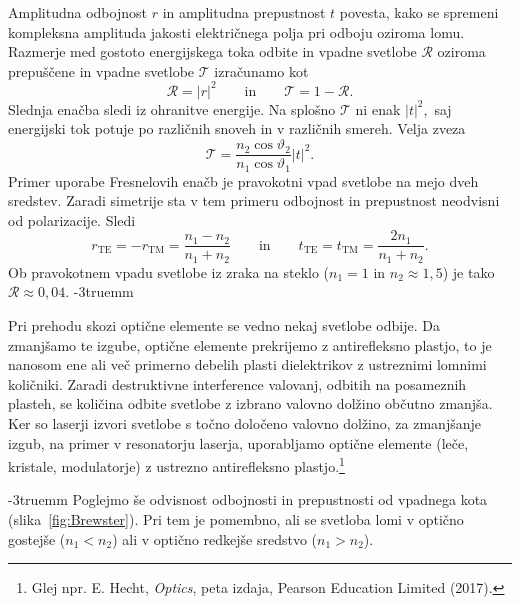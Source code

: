 Amplitudna odbojnost $r$ in amplitudna prepustnost $t$ povesta, kako se spremeni 
kompleksna amplituda jakosti električnega polja pri odboju oziroma lomu.
Razmerje med gostoto energijskega toka odbite in vpadne svetlobe $\mathcal{R}$ oziroma 
prepuščene in vpadne svetlobe $\mathcal{T}$ izračunamo kot 
\begin{equation}
\mathcal{R}=\left|r\right|^{2} \qquad \mathrm{in} \qquad \mathcal{T}=1-\mathcal{R}.
\end{equation}
Slednja enačba sledi iz ohranitve energije. Na splošno $\mathcal{T}$
ni enak $\left|t\right|^{2},$ saj energijski tok potuje po različnih
snoveh in v različnih smereh. Velja zveza
\begin{equation}
\mathcal{T}=\frac{n_{2}\cos\vartheta_{2}}{n_{1}\cos\vartheta_{1}}\left|t\right|^{2}.
\end{equation}
Primer uporabe Fresnelovih enačb je pravokotni vpad svetlobe na mejo dveh sredstev. 
Zaradi simetrije sta v tem primeru odbojnost in prepustnost neodvisni od polarizacije. Sledi
\begin{equation}
r_{\mathrm{TE}} = -r_{\mathrm{TM}} = \frac{n_1-n_2}{n_1+n_2}
\qquad \mathrm{in} \qquad 
t_{\mathrm{TE}} = t_{\mathrm{TM}} = \frac{2n_1}{n_1+n_2}. 
\end{equation}
Ob pravokotnem vpadu svetlobe iz zraka na steklo ($n_1 = 1$ in $n_2 \approx 1,5$) je tako
$\mathcal{R} \approx 0,04$.
\vglue-3truemm
\begin{remark}
Pri prehodu skozi optične elemente se vedno nekaj
svetlobe odbije. Da zmanjšamo te izgube, optične elemente
prekrijemo z antirefleksno plastjo, to je nanosom ene ali več primerno
debelih plasti dielektrikov z ustreznimi lomnimi količniki.
Zaradi destruktivne interference valovanj, odbitih na posameznih plasteh,
se količina odbite svetlobe z izbrano valovno dolžino občutno zmanjša. Ker so laserji
izvori svetlobe s točno določeno valovno dolžino, za zmanjšanje
izgub, na primer v resonatorju laserja, uporabljamo optične
elemente (leče, kristale, modulatorje) z ustrezno antirefleksno plastjo.\footnote{Glej npr. 
E. Hecht, {\it Optics}, peta izdaja, Pearson Education Limited (2017).}
\end{remark}
\vglue-3truemm
Poglejmo še odvisnost odbojnosti in prepustnosti od vpadnega kota (slika~\ref{fig:Brewster}). 
Pri tem je pomembno, ali se svetloba lomi v optično gostejše ($n_1<n_2$) ali v optično
redkejše sredstvo ($n_1>n_2$). 

